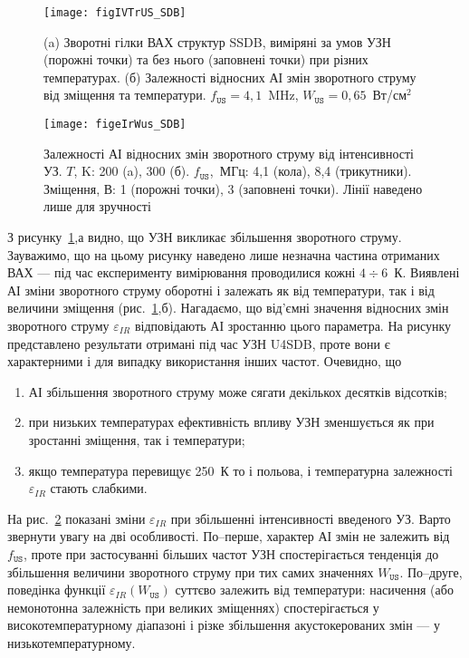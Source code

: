 \begin{figure}
\center
\texttt{[image: figIVTrUS\_SDB]}
\caption{\label{figIVTrUS_SDB}
(a) Зворотні гілки ВАХ структур SSDB, виміряні за умов УЗН (порожні точки) та без нього (заповнені точки) при різних температурах.
(б) Залежності відносних АІ змін зворотного струму від зміщення та температури.
$f_\mathtt{US}=4,1$~MHz, $W_\mathtt{US}=0,65$~Вт/см$^2$
}%
\end{figure}

\begin{figure}
\center
\texttt{[image: figeIrWus\_SDB]}
\caption{\label{figeIrWus_SDB}
Залежності АІ відносних змін зворотного струму від інтенсивності УЗ.
$T$, K: 200 (a), 300 (б).
$f_\mathtt{US}$,~МГц: 4,1 (кола), 8,4 (трикутники).
Зміщення, В: 1 (порожні точки), 3 (заповнені точки).
Лінії наведено лише для зручності
}%
\end{figure}

З рисунку~\ref{figIVTrUS_SDB},а видно, що УЗН викликає збільшення зворотного струму.
Зауважимо, що на цьому рисунку наведено лише незначна частина отриманих ВАХ ---
під час експерименту вимірювання проводилися кожні $4\div6$~К.
Виявлені АІ зміни зворотного струму оборотні і залежать як від температури, так і від величини зміщення (рис.~\ref{figIVTrUS_SDB},б).
Нагадаємо, що від'ємні значення відносних змін зворотного струму $\varepsilon_{IR}$ відповідають
АІ зростанню цього параметра.
На рисунку представлено результати отримані під час УЗН U4SDB, проте вони є характерними і
для випадку використання інших частот.
Очевидно, що
\begin{enumerate}[label=\asbuk*),leftmargin=0em,itemindent=1.5em]
\item АІ збільшення зворотного струму може сягати декількох десятків відсотків;
\item при низьких температурах ефективність впливу УЗН зменшується як при зростанні зміщення, так і температури;
\item якщо температура перевищує 250~К то і польова, і температурна залежності $\varepsilon_{IR}$ стають слабкими.
\end{enumerate}

На рис.~\ref{figeIrWus_SDB} показані зміни $\varepsilon_{IR}$ при збільшенні інтенсивності введеного УЗ.
Варто звернути увагу на дві особливості.
По--перше, характер АІ змін не залежить від $f_\mathtt{US}$,
проте при застосуванні більших частот УЗН спостерігається тенденція до збільшення величини зворотного струму
при тих самих значеннях $W_\mathtt{US}$.
По--друге, поведінка функції $\varepsilon_{IR}(W_\mathtt{US})$ суттєво залежить від температури:
насичення (або немонотонна залежність при великих зміщеннях) спостерігається у високотемпературному діапазоні
і різке збільшення акустокерованих змін --- у низькотемпературному.





